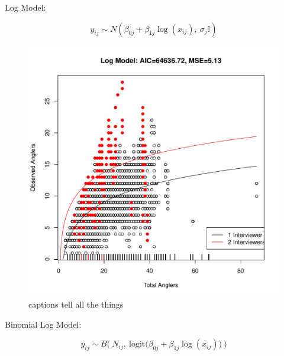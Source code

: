 \documentclass[12pt,]{article}
\begin{document}
Log Model:

\begin{equation}
y_{ij} \sim N(\beta_{0j} + \beta_{1j} \log(x_{ij}),~ \sigma_j \mathbb{I})
\end{equation}

\begin{figure}[htbp]
\centering
\includegraphics{plots/obsAngLogModel.pdf}
\caption{captions tell all the things \label{obsAngLogModel}}
\end{figure}

Binomial Log Model:

\begin{equation}
y_{ij} \sim B\Big( ~N_{ij}, ~\text{logit}\big(\beta_{0j} + \beta_{1j} \log(x_{ij})\big)~ \Big)
\end{equation}
\end{document}
